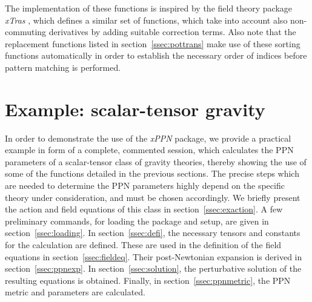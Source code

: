 \documentclass[notitlepage,a4paper,aps,prd,onecolumn,superscriptaddress,nofootinbib,groupedaddress,longbibliography]{revtex4-1}
\newcommand{\xPPN}{\emph{xPPN}}
\newcommand{\xTras}{\emph{xTras}}
\begin{document}
The implementation of these functions is inspired by the field theory package \xTras{} \cite{Nutma:2013zea}, which defines a similar set of functions, which take into account also non-commuting derivatives by adding suitable correction terms. Also note that the replacement functions listed in section~\ref{ssec:pottrans} make use of these sorting functions automatically in order to establish the necessary order of indices before pattern matching is performed.

\section{Example: scalar-tensor gravity}\label{sec:example}
In order to demonstrate the use of the \xPPN{} package, we provide a practical example in form of a complete, commented session, which calculates the PPN parameters of a scalar-tensor class of gravity theories, thereby showing the use of some of the functions detailed in the previous sections. The precise steps which are needed to determine the PPN parameters highly depend on the specific theory under consideration, and must be chosen accordingly. We briefly present the action and field equations of this class in section~\ref{ssec:exaction}. A few preliminary commands, for loading the package and setup, are given in section~\ref{ssec:loading}. In section~\ref{ssec:defi}, the necessary tensors and constants for the calculation are defined. These are used in the definition of the field equations in section~\ref{ssec:fieldeq}. Their post-Newtonian expansion is derived in section~\ref{ssec:ppnexp}. In section~\ref{ssec:solution}, the perturbative solution of the resulting equations is obtained. Finally, in section~\ref{ssec:ppnmetric}, the PPN metric and parameters are calculated.
\end{document}
